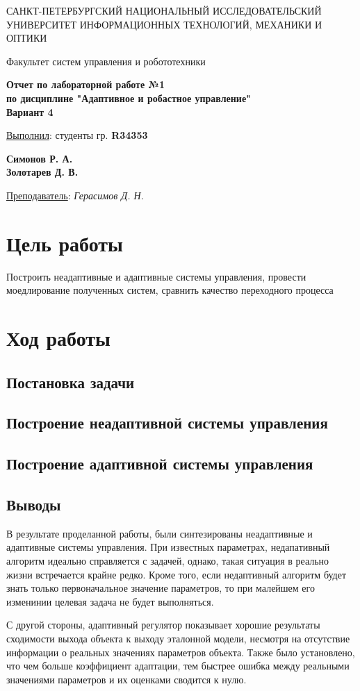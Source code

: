 \documentclass[a5paper, 10pt]{article}
\theoremstyle{definition}
\theoremstyle{plain}
\theoremstyle{remark}
\newcommand*{\titlePage}{
	\thispagestyle{title}
	\begingroup
	\begin{center}
%		
		\vspace*{6ex}
		
		{\small
			САНКТ-ПЕТЕРБУРГСКИЙ НАЦИОНАЛЬНЫЙ ИССЛЕДОВАТЕЛЬСКИЙ УНИВЕРСИТЕТ ИНФОРМАЦИОННЫХ ТЕХНОЛОГИЙ, МЕХАНИКИ И ОПТИКИ	
		}
		
		\vspace*{2ex}
		
		{\normalsize
			Факультет систем управления и робототехники
		}
		
		\vspace*{15ex}
		
		{\Large \bfseries 
			Отчет по лабораторной работе №1 \\ 
			по дисциплине "Адаптивное и робастное управление"\\
   
            Вариант 4
		}
	\end{center}
	\vspace*{20ex}
	\begin{flushright}
		{\large 
			\underline{Выполнил}: студенты гр. \textbf{R34353}\\
			\begin{flushright}
				\textbf{Симонов Р. А.}\\
                    \textbf{Золотарев Д. В.}\\
			\end{flushright}
		}
		
		\vspace*{5ex}
		
		{\large 
			\underline{Преподаватель}: \textit{Герасимов Д. Н.}
		}
	\end{flushright}	
	\newpage
	\setcounter{page}{1}
	\endgroup}
\begin{document}
	\titlePage
	\pagestyle{style}

    \tableofcontents
    \newpage
    
    \section{Цель работы}
        Построить неадаптивные и адаптивные системы управления, провести моедлирование полученных систем, сравнить качество переходного процесса
        
    \section{Ход работы}
        \subsection{Постановка задачи}
            
        \subsection{Построение неадаптивной системы управления}
            
        \subsection{Построение адаптивной системы управления}
            
        \subsection{Выводы}  
            В результате проделанной работы, были синтезированы неадаптивные и адаптивные системы управления. При известных параметрах, недапативный алгоритм идеально справляется с задачей, однако, такая ситуация в реально жизни встречается крайне редко. Кроме того, если недаптивный алгоритм будет знать только первоначальное значение параметров, то при малейшем его изменинии целевая задача не будет выполняться. 

            С другой стороны, адаптивный регулятор показывает хорошие результаты сходимости выхода объекта к выходу эталонной модели, несмотря на отсутствие информации о реальных значениях параметров объекта. Также было установлено, что чем больше коэффициент адаптации, тем быстрее ошибка между реальными значениями параметров и их оценками сводится к нулю.
            
\end{document}
